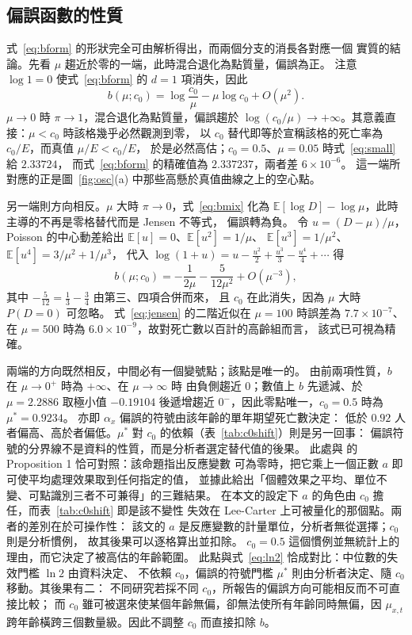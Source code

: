 \documentclass[UTF8, fontset=macnew, a4paper, 12pt]{ctexart}
\newcommand{\Ex}{\mathbb{E}}
\begin{document}
\subsection{偏誤函數的性質}\label{subsec:bprops}

式~\eqref{eq:bform} 的形狀完全可由解析得出，而兩個分支的消長各對應一個
實質的結論。先看 $\mu$ 趨近於零的一端，此時混合退化為點質量，偏誤為正。
注意 $\log 1=0$ 使式~\eqref{eq:bform} 的 $d=1$ 項消失，因此
\begin{equation}\label{eq:small}
b(\mu;c_0)=\log\frac{c_0}{\mu}-\mu\log c_0+O(\mu^2).
\end{equation}
$\mu\to0$ 時 $\pi\to1$，混合退化為點質量，偏誤趨於
$\log(c_0/\mu)\to+\infty$。其意義直接：$\mu<c_0$ 時該格幾乎必然觀測到零，
以 $c_0$ 替代即等於宣稱該格的死亡率為 $c_0/E$，而真值 $\mu/E<c_0/E$，
於是必然高估；$c_0=0.5$、$\mu=0.05$ 時式~\eqref{eq:small} 給 $2.33724$，
而式~\eqref{eq:bform} 的精確值為 $2.337237$，兩者差 $6\times10^{-6}$。
這一端所對應的正是圖~\ref{fig:osc}(a) 中那些高懸於真值曲線之上的空心點。

另一端則方向相反。$\mu$ 大時 $\pi\to0$，式~\eqref{eq:bmix} 化為
$\Ex[\log D]-\log\mu$，此時主導的不再是零格替代而是 Jensen 不等式，
偏誤轉為負。
令 $u=(D-\mu)/\mu$， Poisson 的中心動差給出 $\Ex[u]=0$、$\Ex[u^2]=1/\mu$、
$\Ex[u^3]=1/\mu^2$、$\Ex[u^4]=3/\mu^2+1/\mu^3$，
代入 $\log(1+u)=u-\tfrac{u^2}2+\tfrac{u^3}3-\tfrac{u^4}4+\cdots$ 得
\begin{equation}\label{eq:jensen}
b(\mu;c_0)=-\frac{1}{2\mu}-\frac{5}{12\mu^{2}}+O(\mu^{-3}),
\end{equation}
其中 $-\tfrac5{12}=\tfrac13-\tfrac34$ 由第三、四項合併而來，
且 $c_0$ 在此消失，因為 $\mu$ 大時 $P(D=0)$ 可忽略。
式~\eqref{eq:jensen} 的二階近似在 $\mu=100$ 時誤差為 $7.7\times10^{-7}$、
在 $\mu=500$ 時為 $6.0\times10^{-9}$，故對死亡數以百計的高齡組而言，
該式已可視為精確。

兩端的方向既然相反，中間必有一個變號點；該點是唯一的。
由前兩項性質，$b$ 在 $\mu\to0^{+}$ 時為 $+\infty$、在 $\mu\to\infty$ 時
由負側趨近 $0$；數值上 $b$ 先遞減、於 $\mu=2.2886$ 取極小值 $-0.19104$
後遞增趨近 $0^{-}$，因此零點唯一，$c_0=0.5$ 時為 $\mu^\ast=0.9234$。
亦即 $\alpha_x$ 偏誤的符號由該年齡的單年期望死亡數決定：
低於 $0.92$ 人者偏高、高於者偏低。$\mu^\ast$ 對 $c_0$ 的依賴（表~\ref{tab:c0shift}）則是另一回事：
偏誤符號的分界線不是資料的性質，而是分析者選定替代值的後果。
此處與 \citet{chenroth2024} 的 Proposition 1 恰可對照：該命題指出反應變數
可為零時，把它乘上一個正數 $a$ 即可使平均處理效果取到任何指定的值，
並據此給出「個體效果之平均、單位不變、可點識別三者不可兼得」的三難結果。
在本文的設定下 $a$ 的角色由 $c_0$ 擔任，而表~\ref{tab:c0shift} 即是該不變性
失效在 Lee-Carter 上可被量化的那個點。兩者的差別在於可操作性：
該文的 $a$ 是反應變數的計量單位，分析者無從選擇；$c_0$ 則是分析慣例，
故其後果可以逐格算出並扣除。
$c_0=0.5$ 這個慣例並無統計上的理由，而它決定了被高估的年齡範圍。
此點與式~\eqref{eq:ln2} 恰成對比：中位數的失效門檻 $\ln 2$ 由資料決定、
不依賴 $c_0$，偏誤的符號門檻 $\mu^\ast$ 則由分析者決定、隨 $c_0$ 移動。其後果有二：
不同研究若採不同 $c_0$，所報告的偏誤方向可能相反而不可直接比較；
而 $c_0$ 雖可被選來使某個年齡無偏，卻無法使所有年齡同時無偏，因 $\mu_{x,t}$ 跨年齡橫跨三個數量級。因此不調整 $c_0$ 而直接扣除 $b$。
\end{document}
